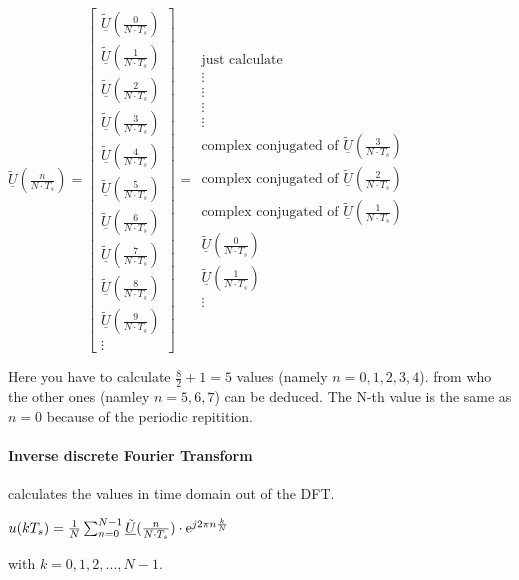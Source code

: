 \(\underline{\tilde{U}}(\frac{n}{N \cdot T_s})= \begin{bmatrix}
\underline{\tilde{U}}(\frac{0}{N \cdot T_s}) \\
\underline{\tilde{U}}(\frac{1}{N \cdot T_s})  \\
\underline{\tilde{U}}(\frac{2}{N \cdot T_s}) \\
\underline{\tilde{U}}(\frac{3}{N \cdot T_s})\\
\underline{\tilde{U}}(\frac{4}{N \cdot T_s})\\
\underline{\tilde{U}}(\frac{5}{N \cdot T_s})\\
\underline{\tilde{U}}(\frac{6}{N \cdot T_s})\\
\underline{\tilde{U}}(\frac{7}{N \cdot T_s})\\
\underline{\tilde{U}}(\frac{8}{N \cdot T_s})\\
\underline{\tilde{U}}(\frac{9}{N \cdot T_s})\\
\vdots 
\end{bmatrix}
\)
=
\(
\begin{matrix}
	\text{just calculate}\\
	\vdots \\
	\vdots \\
	\vdots \\
	\vdots \\
	\text{complex conjugated of } \underline{\tilde{U}}(\frac{3}{N \cdot T_s})\\
	\text{complex conjugated of } \underline{\tilde{U}}(\frac{2}{N \cdot T_s})\\
	\text{complex conjugated of } \underline{\tilde{U}}(\frac{1}{N \cdot T_s})\\
	\underline{\tilde{U}}(\frac{0}{N \cdot T_s})\\
	\underline{\tilde{U}}(\frac{1}{N \cdot T_s})\\
	\vdots 
\end{matrix}
\)

Here you have to calculate \(\frac{8}{2}+1=5\) values (namely $n=0, 1, 2, 3, 4$). from who the other ones (namley $n=5, 6, 7$) can be deduced. The N-th value is the same as $n=0$ because of the periodic repitition. 

\paragraph{Inverse discrete Fourier Transform}
calculates the values in time domain out of the DFT.

\( u(kT_s) = \frac{1}{N} \sum_{n=0}^{N-1} \underline{\tilde{U}}(\frac{n}{N \cdot T_s}) \cdot \mathrm{e}^{j 2 \pi n \frac{k}{N}} \) 

with \(k = 0, 1, 2, ... , N-1\).
